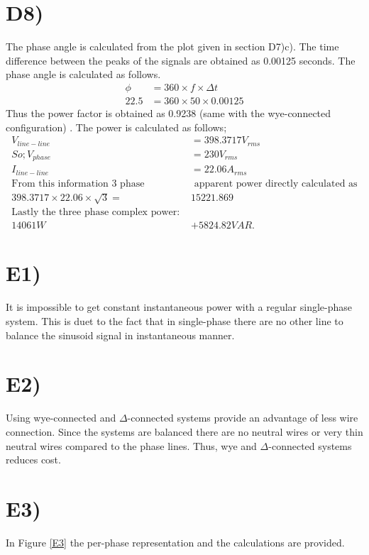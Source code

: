 \documentclass[letterpaper,12pt]{article}
\begin{document}
\section{D8)}
The phase angle is calculated from the plot given in section D7)c). The time difference between the peaks of the signals are obtained as 0.00125 seconds. The phase angle is calculated as follows.
\begin{equation}
    \begin{split}
        \phi &= 360 \times f \times \Delta t\\
        22.5 &= 360 \times 50 \times 0.00125
    \end{split}
\end{equation}
Thus the power factor is obtained as 0.9238 (same with the wye-connected configuration) . The power is calculated as follows;
\begin{equation}
    \begin{split}
        V_{line-line} &= 398.3717 V_{rms}\\
        So; V_{phase} &= 230 V_{rms}\\
        I_{line-line} &= 22.06  A_{rms}\\ 
        \textrm{From this information 3 phase }& \textrm{ apparent power directly calculated as} \\
        398.3717 \times 22.06 \times \sqrt{3} = &15221.869  \\
        \textrm{Lastly the three phase complex power: } \\
         14061 W & +5824.82  VAR .   
    \end{split}
\end{equation} 
\section{E1)}
It is impossible to get constant instantaneous power with a regular single-phase system. This is duet to the fact that in single-phase there are no other line to balance the sinusoid signal in instantaneous manner.
\section{E2)}
Using wye-connected and \(\Delta\)-connected systems provide an advantage of less wire connection. Since the systems are balanced there are no neutral wires or very thin neutral wires compared to the phase lines. Thus, wye and \(\Delta\)-connected systems reduces cost.

\section{E3)}
In Figure  \ref*{E3} the per-phase representation and the calculations are provided.
\end{document}
